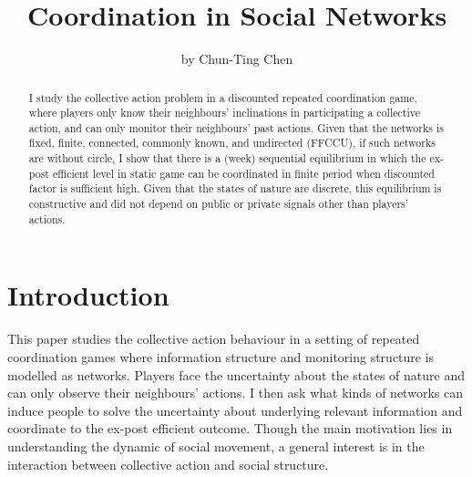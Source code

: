 \documentclass[12pt,letter]{article}
\theoremstyle{definition}
\theoremstyle{remark}
\theoremstyle{claim}
\begin{document}

\title {Coordination in Social Networks}
\author {by Chun-Ting Chen}

\maketitle

\begin{abstract}

I study the collective action problem in a discounted repeated coordination game, where players only know their neighbours' inclinations in participating a collective action, and can only monitor their neighbours' past actions. Given that the networks is fixed, finite, connected, commonly known, and undirected (FFCCU), if such networks are without circle, I show that there is a (week) sequential equilibrium in which the ex-post efficient level in static game can be coordinated in finite period when discounted factor is sufficient high. Given that the states of nature are discrete, this equilibrium is constructive and did not depend on public or private signals other than players' actions. 



\end{abstract}


\section{Introduction} 

This paper studies the collective action behaviour in a setting of repeated coordination games where information structure and monitoring structure is modelled as networks. Players face the uncertainty about the states of nature and can only observe their neighbours' actions. I then ask what kinds of networks can induce people to solve the uncertainty about underlying relevant information and coordinate to the ex-post efficient outcome. Though the main motivation lies in understanding the dynamic of social movement, a general interest is in the interaction between collective action and social structure.
\end{document}

